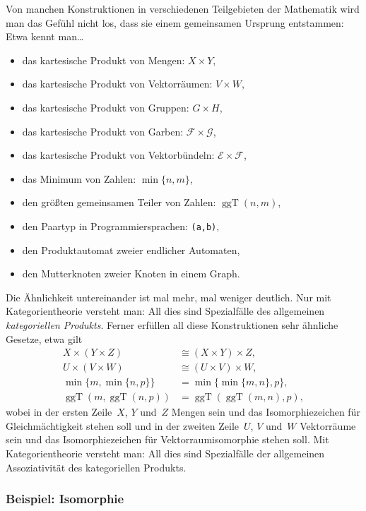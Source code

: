 \documentclass[a4paper,ngerman]{scrartcl}
\theoremstyle{definition}
\theoremstyle{plain}
\theoremstyle{remark}
\DeclareMathOperator{\ggT}{ggT}
\begin{document}
Von manchen Konstruktionen in verschiedenen Teilgebieten der Mathematik wird
man das Gefühl nicht los, dass sie einem gemeinsamen Ursprung entstammen: Etwa
kennt man\ldots
\begin{itemize}
  \item das kartesische Produkt von Mengen: $X \times Y$,
  \item das kartesische Produkt von Vektorräumen: $V \times W$,
  \item das kartesische Produkt von Gruppen: $G \times H$,
  \item das kartesische Produkt von Garben: $\mathcal{F} \times \mathcal{G}$,
  \item das kartesische Produkt von Vektorbündeln: $\mathcal{E} \times \mathcal{F}$,
  \item das Minimum von Zahlen: $\min\{n,m\}$,
  \item den größten gemeinsamen Teiler von Zahlen: $\ggT(n,m)$,
  \item den Paartyp in Programmiersprachen: \texttt{(a,b)},
  \item den Produktautomat zweier endlicher Automaten,
  \item den Mutterknoten zweier Knoten in einem Graph.
\end{itemize}
Die Ähnlichkeit untereinander ist mal mehr, mal weniger deutlich. Nur mit
Kategorientheorie versteht man: All dies sind Spezialfälle des allgemeinen
\emph{kategoriellen Produkts}. Ferner erfüllen all diese Konstruktionen sehr
ähnliche Gesetze, etwa gilt
\begin{align*}
  X \times (Y \times Z) &\cong (X \times Y) \times Z, \\
  U \times (V \times W) &\cong (U \times V) \times W, \\
  \min\{m,\min\{n,p\}\} &= \min\{\min\{m,n\},p\}, \\
  \ggT(m,\ggT(n,p)) &= \ggT(\ggT(m,n),p),
\end{align*}
wobei in der ersten Zeile~$X$, $Y$ und~$Z$ Mengen sein und das
Isomorphiezeichen für Gleichmächtigkeit stehen soll und in der zweiten
Zeile~$U$, $V$ und~$W$ Vektorräume sein und das Isomorphiezeichen für
Vektorraumisomorphie stehen soll. Mit Kategorientheorie versteht man:
All dies sind Spezialfälle der allgemeinen Assoziativität des kategoriellen
Produkts.

\subsubsection*{Beispiel: Isomorphie}
\end{document}
